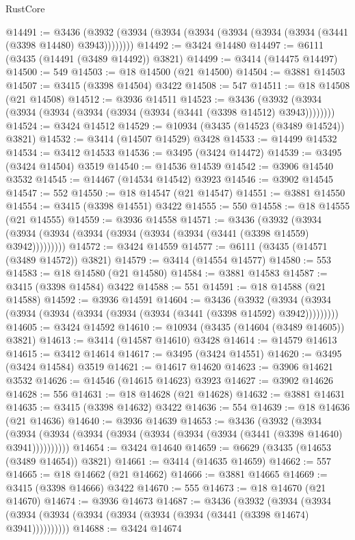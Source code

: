 \begin{lexlean}{RustCore}
\begin{coremodule}
@14491 := @3436 (@3932 (@3934 (@3934 (@3934 (@3934 (@3934 (@3934 (@3441 (@3398 @14480) @3943))))))))
@14492 := @3424 @14480
@14497 := @6111 (@3435 (@14491 (@3489 @14492)) @3821)
@14499 := @3414 (@14475 @14497)
@14500 := 549
@14503 := @18 @14500 (@21 @14500)
@14504 := @3881 @14503
@14507 := @3415 (@3398 @14504) @3422
@14508 := 547
@14511 := @18 @14508 (@21 @14508)
@14512 := @3936 @14511
@14523 := @3436 (@3932 (@3934 (@3934 (@3934 (@3934 (@3934 (@3934 (@3441 (@3398 @14512) @3943))))))))
@14524 := @3424 @14512
@14529 := @10934 (@3435 (@14523 (@3489 @14524)) @3821)
@14532 := @3414 (@14507 @14529) @3428
@14533 := @14499 @14532
@14534 := @3412 @14533
@14536 := @3495 (@3424 @14472)
@14539 := @3495 (@3424 @14504) @3519
@14540 := @14536 @14539
@14542 := @3906 @14540 @3532
@14545 := @14467 (@14534 @14542) @3923
@14546 := @3902 @14545
@14547 := 552
@14550 := @18 @14547 (@21 @14547)
@14551 := @3881 @14550
@14554 := @3415 (@3398 @14551) @3422
@14555 := 550
@14558 := @18 @14555 (@21 @14555)
@14559 := @3936 @14558
@14571 := @3436
    (@3932 (@3934 (@3934 (@3934 (@3934 (@3934 (@3934 (@3934 (@3441 (@3398 @14559) @3942)))))))))
@14572 := @3424 @14559
@14577 := @6111 (@3435 (@14571 (@3489 @14572)) @3821)
@14579 := @3414 (@14554 @14577)
@14580 := 553
@14583 := @18 @14580 (@21 @14580)
@14584 := @3881 @14583
@14587 := @3415 (@3398 @14584) @3422
@14588 := 551
@14591 := @18 @14588 (@21 @14588)
@14592 := @3936 @14591
@14604 := @3436
    (@3932 (@3934 (@3934 (@3934 (@3934 (@3934 (@3934 (@3934 (@3441 (@3398 @14592) @3942)))))))))
@14605 := @3424 @14592
@14610 := @10934 (@3435 (@14604 (@3489 @14605)) @3821)
@14613 := @3414 (@14587 @14610) @3428
@14614 := @14579 @14613
@14615 := @3412 @14614
@14617 := @3495 (@3424 @14551)
@14620 := @3495 (@3424 @14584) @3519
@14621 := @14617 @14620
@14623 := @3906 @14621 @3532
@14626 := @14546 (@14615 @14623) @3923
@14627 := @3902 @14626
@14628 := 556
@14631 := @18 @14628 (@21 @14628)
@14632 := @3881 @14631
@14635 := @3415 (@3398 @14632) @3422
@14636 := 554
@14639 := @18 @14636 (@21 @14636)
@14640 := @3936 @14639
@14653 := @3436
    (@3932
      (@3934 (@3934 (@3934 (@3934 (@3934 (@3934 (@3934 (@3934 (@3441 (@3398 @14640) @3941))))))))))
@14654 := @3424 @14640
@14659 := @6629 (@3435 (@14653 (@3489 @14654)) @3821)
@14661 := @3414 (@14635 @14659)
@14662 := 557
@14665 := @18 @14662 (@21 @14662)
@14666 := @3881 @14665
@14669 := @3415 (@3398 @14666) @3422
@14670 := 555
@14673 := @18 @14670 (@21 @14670)
@14674 := @3936 @14673
@14687 := @3436
    (@3932
      (@3934 (@3934 (@3934 (@3934 (@3934 (@3934 (@3934 (@3934 (@3441 (@3398 @14674) @3941))))))))))
@14688 := @3424 @14674

\end{coremodule}
\end{lexlean}
